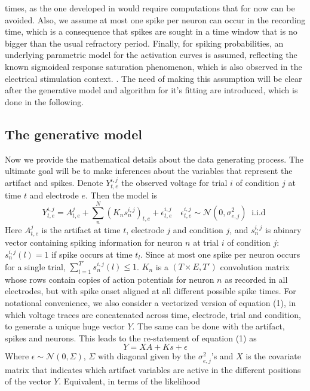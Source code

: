 \documentclass[12pt,letterpaper,fleqn]{article}
\begin{document}
times, as the one developed in \cite{EkanadhamEtal11} would require computations that for now can be avoided.  Also, we assume at most one spike per neuron can occur in the recording time, which is a consequence that spikes are sought in a time window that is no bigger than the usual refractory period. Finally, for spiking probabilities, an underlying parametric model for the activation curves is assumed, reflecting the known sigmoideal response saturation phenomenon, which is also observed in the electrical stimulation context. \cite{GrosbergEtal14}. The need of making this assumption will be clear after the generative model and algorithm for it's fitting are introduced, which is done in the following. 


\subsection{The generative model}
Now we provide the mathematical details about the data generating process. The ultimate goal will be to make inferences about the variables that represent the artifact and spikes.
 Denote $Y_{t,e}^{i,j}$ the observed voltage for trial $i$ of condition $j$ at time $t$ and electrode $e$. Then the model is
\begin{equation} Y_{t,e}^{i,j}=A_{t,e}^j+\sum_n^N (K_n s_n^{i,j})_{t,e}+\epsilon_{t,e}^{i,j}\quad\epsilon_{t,e}^{i,j} \sim \mathcal{N}\left(0,\sigma^2_{e,j}\right) \;\; \text{i.i.d }\end{equation}
Here $A_{t,e}^j$  is the artifact at time $t$, electrode $j$ and condition $j$, and $s_n^{i,j}$ is abinary vector containing spiking information for neuron $n$ at trial $i$ of condition $j$: $s_n^{i,j}(l)=1$ if spike occurs at time $t_{l}$. Since at most one spike per neuron occurs for a single trial, $ \sum_{l=1}^{T'}s_n^{i,j}(l)\leq1$. $K_n$ is a $(T\times E, T')$ convolution matrix whose rows contain copies of action potentials for neuron $n$ as recorded in all electrodes, but with spike onset aligned at all different possible spike times. For notational convenience, we also consider a vectorized version of equation (1), in which voltage traces are concatenated across time, electrode, trial and condition, to generate a unique huge vector $Y$. The same can be done with the artifact, spikes and neurons. This leads to the re-statement of equation (1) as
\begin{equation}
Y=XA+Ks+\epsilon
\end{equation}
Where $\epsilon \sim \mathcal{N}(0,\Sigma)$, $\Sigma$ with diagonal given by the $\sigma^2_{e,j}$'s  and $X$ is the covariate matrix that indicates which artifact variables are active in the different positions of the vector $Y$. Equivalent, in terms of the likelihood
\end{document}
